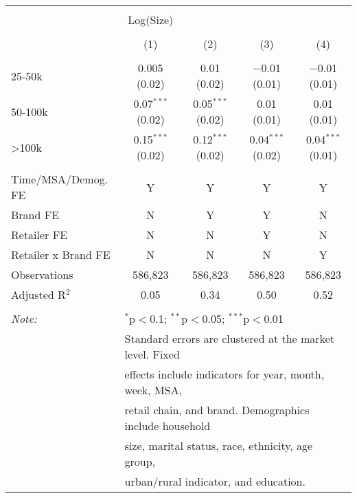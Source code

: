 
\begin{table}[!htbp] \centering 
  \caption{} 
  \label{tab:packageSizeFull8444} 
\begin{tabular}{@{\extracolsep{5pt}}lcccc} 
\\[-1.8ex]\hline 
\hline \\[-1.8ex] 
 & Log(Size) &  &  &  \\ 
\\[-1.8ex] & (1) & (2) & (3) & (4)\\ 
\hline \\[-1.8ex] 
 25-50k & 0.005 (0.02) & 0.01 (0.02) & $-$0.01 (0.01) & $-$0.01 (0.01) \\ 
  50-100k & 0.07$^{***}$ (0.02) & 0.05$^{***}$ (0.02) & 0.01 (0.01) & 0.01 (0.01) \\ 
  >100k & 0.15$^{***}$ (0.02) & 0.12$^{***}$ (0.02) & 0.04$^{***}$ (0.02) & 0.04$^{***}$ (0.01) \\ 
 \hline \\[-1.8ex] 
Time/MSA/Demog. FE & Y & Y & Y & Y \\ 
Brand FE & N & Y & Y & N \\ 
Retailer FE & N & N & Y & N \\ 
Retailer x Brand FE & N & N & N & Y \\ 
Observations & 586,823 & 586,823 & 586,823 & 586,823 \\ 
Adjusted R$^{2}$ & 0.05 & 0.34 & 0.50 & 0.52 \\ 
\hline 
\hline \\[-1.8ex] 
\textit{Note:}  & \multicolumn{4}{l}{$^{*}$p$<$0.1; $^{**}$p$<$0.05; $^{***}$p$<$0.01} \\ 
 & \multicolumn{4}{l}{Standard errors are clustered at the market level. Fixed } \\ 
 & \multicolumn{4}{l}{effects include indicators for year, month, week, MSA, } \\ 
 & \multicolumn{4}{l}{retail chain, and brand. Demographics include household } \\ 
 & \multicolumn{4}{l}{size, marital status, race, ethnicity, age group, } \\ 
 & \multicolumn{4}{l}{urban/rural indicator, and education.} \\ 
\end{tabular} 
\end{table} 
